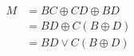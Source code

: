 \documentclass[border=2pt]{standalone}
\begin{document}
\Large
\(\begin{aligned}
M &= BC \oplus CD \oplus BD \\
  &= BD \oplus C(B \oplus D) \\
  &= BD \lor C(B \oplus D)
\end{aligned}\)
\end{document}
